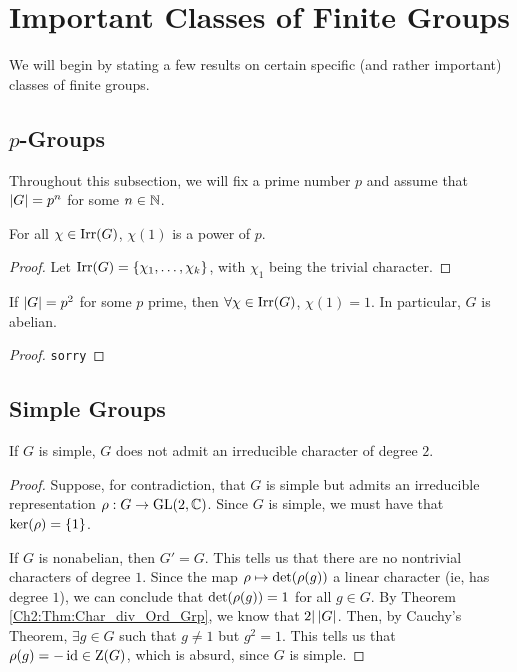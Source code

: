 \section{Important Classes of Finite Groups}

We will begin by stating a few results on certain specific (and rather important) classes of finite groups.

\subsection{$p$-Groups}

Throughout this subsection, we will fix a prime number $p$ and assume that $\left\lvert G \right\rvert = p^n$ for some $n \in \mathbb{N}$.

\begin{lemma} For all $\chi \in \operatorname{Irr}\!\left( G \right)$, $\chi(1)$ is a power of $p$.
\end{lemma}
\begin{proof}
    Let $\operatorname{Irr}\!\left( G \right) = \left\{ \chi_1, \ldots, \chi_k \right\}$, with $\chi_1$ being the trivial character. 
\end{proof}
\begin{corollary}
    If $\left\lvert G \right\rvert = p^2$ for some $p$ prime, then $\forall \chi \in \operatorname{Irr}\!\left( G \right)$, $\chi(1) = 1$. In particular, $G$ is abelian.
\end{corollary}
\begin{proof}
    \verb|sorry|
\end{proof}

\subsection{Simple Groups}

\begin{lemma}
    If $G$ is simple, $G$ does not admit an irreducible character of degree $2$.
\end{lemma}
\begin{proof}
    Suppose, for contradiction, that $G$ is simple but admits an irreducible representation $\rho : G \to \operatorname{GL}\!\left( 2, \mathbb{C} \right)$. Since $G$ is simple, we must have that $\operatorname{ker}\!\left( \rho \right) = \left\{ 1 \right\}$.

    If $G$ is nonabelian, then $G' = G$. This tells us that there are no nontrivial characters of degree $1$. Since the map $\rho \mapsto \det\!\left( \rho(g) \right)$ a linear character (ie, has degree $1$), we can conclude that $\det\!\left( \rho(g) \right) = 1$ for all $g \in G$. By Theorem \ref{Ch2:Thm:Char_div_Ord_Grp}, we know that $2 \vert \left\lvert G \right\rvert$. Then, by Cauchy's Theorem, $\exists g \in G$ such that $g \neq 1$ but $g^2 = 1$. This tells us that $\rho(g) = -\operatorname{id} \in \operatorname{Z}\!\left( G \right)$, which is absurd, since $G$ is simple. 
\end{proof}

